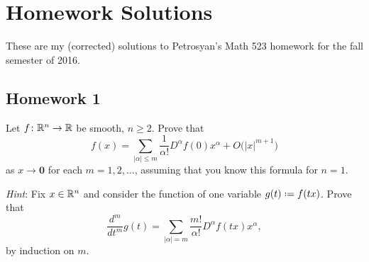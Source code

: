 \section{Homework Solutions}
These are my (corrected) solutions to Petrosyan's Math 523 homework for the
fall semester of 2016.

\subsection{Homework 1}
\begin{problem}
  Let \(f\colon\mathbb{R}^n\to\mathbb{R}\) be smooth, \(n\geq 2\). Prove that
  \[
    f(x)=\sum_{|\alpha|\leq m}
    \frac{1}{\alpha!}D^\alpha f(0)x^\alpha+O\bigl(|x|^{m+1}\bigr)
  \]
  as \(x\to\mathbf{0}\) for each \(m=1,2,\dotsc\), assuming that you know this
  formula for \(n=1\).

  \noindent \emph{Hint}: Fix \(x\in\mathbb{R}^n\) and consider the function of one
  variable \(g(t)\defeq f(tx)\). Prove that
  \[
    \frac{d^m}{dt^m}g(t)
    =\sum_{|\alpha|=m}\frac{m!}{\alpha!} D^\alpha f(tx)x^\alpha,
  \]
  by induction on \(m\).
\end{problem}
